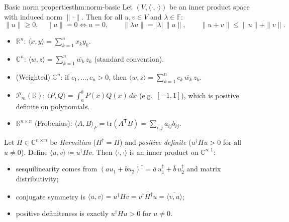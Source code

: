 \begin{theorem}{Basic norm properties}{thm:norm-basic}
Let $(V,\langle\cdot,\cdot\rangle)$ be an inner product space with induced norm $\|\cdot\|$.
Then for all $u,v\in V$ and $\lambda\in\mathbb{F}$:
\[
\|u\|\ge 0,\quad \|u\|=0\iff u=0,\qquad \|\lambda u\|=|\lambda|\,\|u\|,\qquad \|u+v\|\le \|u\|+\|v\|.
\]
\end{theorem}

\begin{examplebox}[title={Examples (Lecture Week 11): standard/weighted/integral/Frobenius inner products}]
\begin{itemize}[leftmargin=*]
\item $\mathbb{R}^n$: $\langle x,y\rangle=\sum_{k=1}^n x_k y_k$.
\item $\mathbb{C}^n$: $\langle w,z\rangle=\sum_{k=1}^n \overline{w_k}\,z_k$ (standard convention).
\item (Weighted) $\mathbb{C}^n$: if $c_1,\dots,c_n>0$, then $\langle w,z\rangle=\sum_{k=1}^n c_k\,\overline{w_k}\,z_k$.
\item $\mathcal{P}_m(\mathbb{R})$: $\langle P,Q\rangle=\int_{a}^{b} P(x)Q(x)\,dx$ (e.g.\ $[-1,1]$), which is positive definite on polynomials.
\item $\mathbb{R}^{n\times n}$ (Frobenius): $\langle A,B\rangle_F=\mathrm{tr}(A^{\mathsf T}B)=\sum_{i,j} a_{ij}b_{ij}$.
\end{itemize}
\end{examplebox}

\begin{examplebox}[title={Worked Example (Tutorial 10, Question 4(a)): inner products from Hermitian positive definite matrices}]
Let $H\in\mathbb{C}^{n\times n}$ be \emph{Hermitian} ($H^\dagger=H$) and \emph{positive definite}
($u^\dagger H u>0$ for all $u\neq 0$). Define $\langle u,v\rangle\coloneqq u^\dagger H v$.
Then $\langle\cdot,\cdot\rangle$ is an inner product on $\mathbb{C}^{n,1}$:
\begin{itemize}[leftmargin=*]
\item sesquilinearity comes from $(au_1+bu_2)^\dagger=\overline{a}\,u_1^\dagger+\overline{b}\,u_2^\dagger$ and matrix distributivity;
\item conjugate symmetry is $\langle u,v\rangle=u^\dagger Hv=\overline{v^\dagger H^\dagger u}=\overline{\langle v,u\rangle}$;
\item positive definiteness is exactly $u^\dagger H u>0$ for $u\neq 0$.
\end{itemize}
\end{examplebox}

